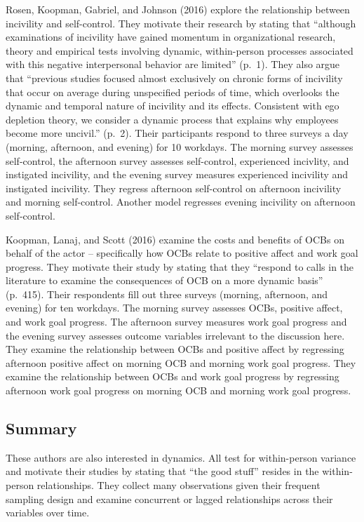 \documentclass[english,,man]{apa6}
\theoremstyle{definition}
\theoremstyle{definition}
\theoremstyle{definition}
\theoremstyle{remark}
\begin{document}
Rosen, Koopman, Gabriel, and Johnson (2016) explore the relationship
between incivility and self-control. They motivate their research by
stating that \enquote{although examinations of incivility have gained
momentum in organizational research, theory and empirical tests
involving dynamic, within-person processes associated with this negative
interpersonal behavior are limited} (p.~1). They also argue that
\enquote{previous studies focused almost exclusively on chronic forms of
incivility that occur on average during unspecified periods of time,
which overlooks the dynamic and temporal nature of incivility and its
effects. Consistent with ego depletion theory, we consider a dynamic
process that explains why employees become more uncivil.} (p.~2). Their
participants respond to three surveys a day (morning, afternoon, and
evening) for 10 workdays. The morning survey assesses self-control, the
afternoon survey assesses self-control, experienced incivlity, and
instigated incivility, and the evening survey measures experienced
incivility and instigated incivility. They regress afternoon
self-control on afternoon incivility and morning self-control. Another
model regresses evening incivility on afternoon self-control.

Koopman, Lanaj, and Scott (2016) examine the costs and benefits of OCBs
on behalf of the actor -- specifically how OCBs relate to positive
affect and work goal progress. They motivate their study by stating that
they \enquote{respond to calls in the literature to examine the
consequences of OCB on a more dynamic basis} (p.~415). Their respondents
fill out three surveys (morning, afternoon, and evening) for ten
workdays. The morning survey assesses OCBs, positive affect, and work
goal progress. The afternoon survey measures work goal progress and the
evening survey assesses outcome variables irrelevant to the discussion
here. They examine the relationship between OCBs and positive affect by
regressing afternoon positive affect on morning OCB and morning work
goal progress. They examine the relationship between OCBs and work goal
progress by regressing afternoon work goal progress on morning OCB and
morning work goal progress.

\hypertarget{summary-1}{%
\subsection{Summary}\label{summary-1}}

These authors are also interested in dynamics. All test for
within-person variance and motivate their studies by stating that
\enquote{the good stuff} resides in the within-person relationships.
They collect many observations given their frequent sampling design and
examine concurrent or lagged relationships across their variables over
time.
\end{document}
